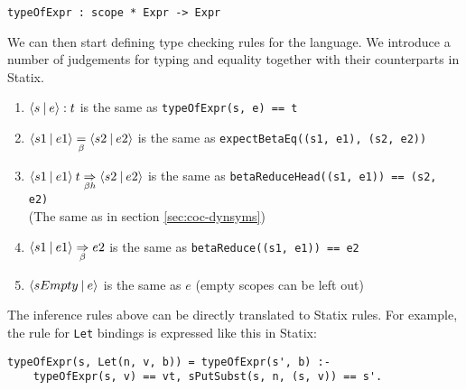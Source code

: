 \begin{lstlisting}
typeOfExpr : scope * Expr -> Expr
\end{lstlisting}
We can then start defining type checking rules for the language. We introduce a number of judgements for typing and equality together with their counterparts in Statix.
\begin{enumerate}
	\item $\langle s \: | \: e\rangle : t$ is the same as \verb|typeOfExpr(s, e) == t|
	\item $\langle s1 \: | \: e1\rangle \underset{\beta}{=} \langle s2 \: | \: e2\rangle$ is the same as \verb|expectBetaEq((s1, e1), (s2, e2))|
	\item $\langle s1 \: | \: e1\rangle \: t \underset{\beta h}{\Rightarrow} \langle s2 \: | \: e2\rangle$ is the same as \verb|betaReduceHead((s1, e1)) == (s2, e2)| \\ (The same as in section \ref{sec:coc-dynsyms})
	\item $\langle s1 \: | \: e1\rangle \underset{\beta}{\Rightarrow} e2$ is the same as \verb|betaReduce((s1, e1)) == e2|
	\item $\langle sEmpty \: | \: e\rangle$ is the same as $e$ (empty scopes can be left out)
\end{enumerate}

The inference rules above can be directly translated to Statix rules. For example, the rule for \verb|Let| bindings is expressed like this in Statix:
\begin{lstlisting}
typeOfExpr(s, Let(n, v, b)) = typeOfExpr(s', b) :-
    typeOfExpr(s, v) == vt, sPutSubst(s, n, (s, v)) == s'.
\end{lstlisting}


